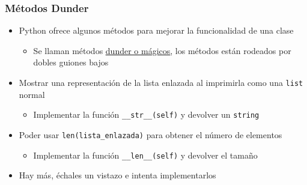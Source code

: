 \documentclass[11pt]{beamer}
\begin{document}
	\begin{frame}[fragile]
		\frametitle{Métodos Dunder}
		\begin{itemize}
			\item Python ofrece algunos métodos para mejorar la funcionalidad de una clase
			\begin{itemize}
				\item Se llaman métodos \href{https://docs.python.org/3/reference/datamodel.html#special-method-names}{{\color{blue}\underline{dunder o mágicos}}}, los métodos están rodeados por dobles guiones bajos
			\end{itemize}
			\item Mostrar una representación de la lista enlazada al imprimirla como una \texttt{list} normal
			\begin{itemize}
				\item Implementar la función \lstinline|__str__(self)| y devolver un \texttt{string}
			\end{itemize}
			\item Poder usar \lstinline|len(lista_enlazada)| para obtener el número de elementos
			\begin{itemize}
				\item Implementar la función \lstinline|__len__(self)| y devolver el tamaño
			\end{itemize}
			\item Hay más, échales un vistazo e intenta implementarlos
		\end{itemize}
	\end{frame}
\end{document}
